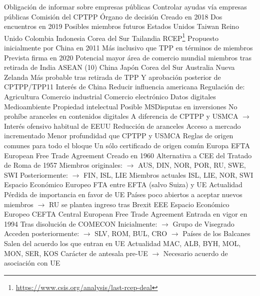 \documentclass{nuevotema}
\begin{document}
\begin{esquemal}
				\4 Obligación de informar sobre empresas públicas
				\4[] Controlar ayudas vía empresas públicas
				\4 Comisión del CPTPP
				\4[] Órgano de decisión
				\4[] Creado en 2018
				\4[] Dos encuentros en 2019
				\4 Posibles miembros futuros
				\4[] Estados Unidos
				\4[] Taiwan
				\4[] Reino Unido
				\4[] Colombia
				\4[] Indonesia
				\4[] Corea del Sur
				\4[] Tailandia
			\3 RCEP\footnote{\url{https://www.csis.org/analysis/last-rcep-deal}}
				\4 Propuesto inicialmente por China en 2011
				\4[] Más inclusivo que TPP en términos de miembros
				\4 Prevista firma en 2020
				\4 Potencial mayor área de comercio mundial
				 miembros tras retirada de India
				\4[] ASEAN (10)
				\4[] China
				\4[] Japón
				\4[] Corea del Sur
				\4[] Australia
				\4[] Nueva Zelanda
				\4 Más probable tras retirada de TPP
				\4[] Y aprobación posterior de CPTPP/TPP11
				\4 Interés de China
				\4[] Reducir influencia americana
				\4 Regulación de:
				\4[] Agricultura
				\4[] Comercio industrial
				\4[] Comercio electrónico
				\4[] Datos digitales
				\4[] Medioambiente
				\4[] Propiedad intelectual
				\4 Posible MSDisputas en inversiones
				\4 No prohíbe aranceles en contenidos digitales
				\4[] A diferencia de CPTPP y USMCA
				\4[] $\to$ Interés ofensivo habitual de EEUU
				\4 Reducción de aranceles
				\4 Acceso a mercado incrementado
				\4 Menor profundidad que CPTPP y USMCA
				\4 Reglas de origen comunes para todo el bloque
				\4[] Un sólo certificado de origen común
		\2 Europa
			\3 EFTA
				\4 European Free Trade Agreement
				\4 Creado en 1960
				\4[] Alternativa a CEE del Tratado de Roma de 1957
				\4[] Miembros originales:
				\4[] $\to$ AUS, DIN, NOR, POR, RU, SWE, SWI
				\4[] Posteriormente:
				\4[] $\to$ FIN, ISL, LIE
				\4 Miembros actuales
				\4[] ISL, LIE, NOR, SWI
				\4 Espacio Económico Europeo
				\4[] FTA entre EFTA (salvo Suiza) y UE
				\4 Actualidad
				\4[] Pérdida de importancia en favor de UE
				\4[] Países poco abiertos a aceptar nuevos miembros
				\4[] $\to$ RU se plantea ingreso tras Brexit
			\3 EEE
				\4 Espacio Económico Europeo
			\3 CEFTA
				\4 Central European Free Trade Agreement
				\4 Entrada en vigor en 1994
				\4[] Tras disolución de COMECON
				\4[] Inicialmente:
				\4[] $\to$ Grupo de Visegrado
				\4[] Acceden posteriormente:
				\4[] $\to$ SLV, ROM, BUL, CRO
				\4[] $\to$ Países de los Balcanes
				\4[] Salen del acuerdo los que entran en UE
				\4 Actualidad
				\4[] MAC, ALB, BYH, MOL, MON, SER, KOS
				\4[] Carácter de antesala pre-UE
				\4[] $\to$ Necesario acuerdo de asociación con UE

\end{esquemal}
\end{document}
